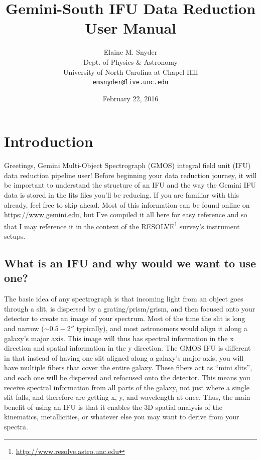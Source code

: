 \documentclass[12pt]{report}
\begin{document}
\title{Gemini-South IFU Data Reduction User Manual}
\author{Elaine M. Snyder\\
Dept. of Physics \& Astronomy\\
University of North Carolina at Chapel Hill \\
\texttt{emsnyder@live.unc.edu}}
\date{February 22, 2016}
\maketitle

\hypersetup{linkcolor=magenta}
\tableofcontents
\listoffigures
\begingroup
\let\clearpage\relax
\listoftables
\endgroup


\chapter{Introduction}
Greetings, Gemini Multi-Object Spectrograph (GMOS) integral field unit (IFU) data reduction pipeline user! Before beginning your data reduction journey, it will be important to understand the structure of an IFU and the way the Gemini IFU data is stored in the fits files you'll be reducing. If you are familiar with this already, feel free to skip ahead. Most of this information can be found online on \url{https://www.gemini.edu}, but I've compiled it all here for easy reference and so that I may reference it in the context of the RESOLVE\footnote{\url{http://www.resolve.astro.unc.edu}} survey's instrument setups.

\section{What is an IFU and why would we want to use one?}
\label{ifu}
The basic idea of any spectrograph is that incoming light from an object goes through a slit, is dispersed by a grating/prism/grism, and then focused onto your detector to create an image of your spectrum. Most of the time the slit is long and narrow ($\sim0.5-2''$ typically), and most astronomers would align it along a galaxy's major axis. This image will thus has spectral information in the x direction and spatial information in the y direction. The GMOS IFU is different in that instead of having one slit aligned along a galaxy's major axis, you will have multiple fibers that cover the entire galaxy. These fibers act as ``mini slits'', and each one will be dispersed and refocused onto the detector. This means you receive spectral information from all parts of the galaxy, not just where a single slit falls, and therefore are getting x, y, and wavelength at once. Thus, the main benefit of using an IFU is that it enables the 3D spatial analysis of the kinematics, metallicities, or whatever else you may want to derive from your spectra.
\end{document}
